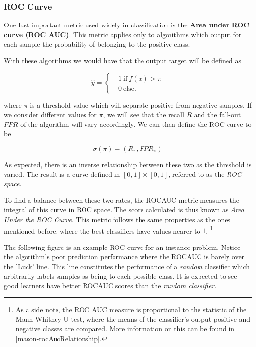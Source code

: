 \subsubsection{ROC Curve}

One last important metric used widely in classification is the \textbf{Area under ROC curve (ROC AUC)}. This metric applies only to algorithms which output for each sample the probability of belonging to the positive class. 

With these algorithms we would have that the output target will be defined as

\begin{equation}
\hat{y} =
\begin{cases}
&1 \ \mbox{if} \ f(x) > \pi \\
&0 \ \mbox{else}.
\end{cases}
\end{equation}

where $\pi$ is a threshold value which will separate positive from negative samples. If we consider different values for $\pi$, we will see that the recall $R$ and the fall-out $FPR$ of the algorithm will vary accordingly. We can then define the ROC curve to be 

\begin{equation}
\sigma(\pi) = (R_\pi, FPR_\pi)
\end{equation}

As expected, there is an inverse relationship between these two as the threshold is varied. The result is a curve defined in $[0,1]\times[0,1]$, referred to as the \textit{ROC space}.

To find a balance between these two rates, the ROCAUC metric measures the integral of this curve in ROC space. The score calculated is thus known as \textit{Area Under the ROC Curve}. This metric follows the same properties as the ones mentioned before, where the best classifiers have values nearer to $1$. \footnote{As a side note, the ROC AUC measure is proportional to the statistic of the Mann-Whitney U-test, where the means of the classifier's output positive and negative classes are compared. More information on this can be found in \cref{mason-rocAucRelationship}.}



The following figure is an example ROC curve for an instance problem. Notice the algorithm's poor prediction performance where the ROCAUC is barely over the 'Luck' line. This line constitutes the performance of a \textit{random} classifier which arbitrarily labels samples as being to each possible class. It is expected to see good learners have better ROCAUC scores than the \textit{random classifier}.

